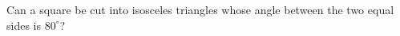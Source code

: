 Can a square be cut into isosceles triangles whose angle between the two equal sides is $80^\circ$?
